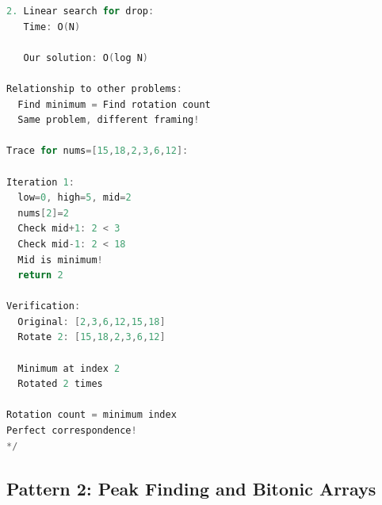 \documentclass[11pt,a4paper,oneside]{book}
\begin{document}
\begin{lstlisting}[language=C++, caption=Complete Rotated Array Solutions]
2. Linear search for drop:
   Time: O(N)
   
   Our solution: O(log N)

Relationship to other problems:
  Find minimum = Find rotation count
  Same problem, different framing!

Trace for nums=[15,18,2,3,6,12]:

Iteration 1:
  low=0, high=5, mid=2
  nums[2]=2
  Check mid+1: 2 < 3 
  Check mid-1: 2 < 18 
  Mid is minimum!
  return 2 

Verification:
  Original: [2,3,6,12,15,18]
  Rotate 2: [15,18,2,3,6,12]
  
  Minimum at index 2
  Rotated 2 times 

Rotation count = minimum index
Perfect correspondence!
*/
\end{lstlisting}

\subsection{Pattern 2: Peak Finding and Bitonic Arrays}
\end{document}
